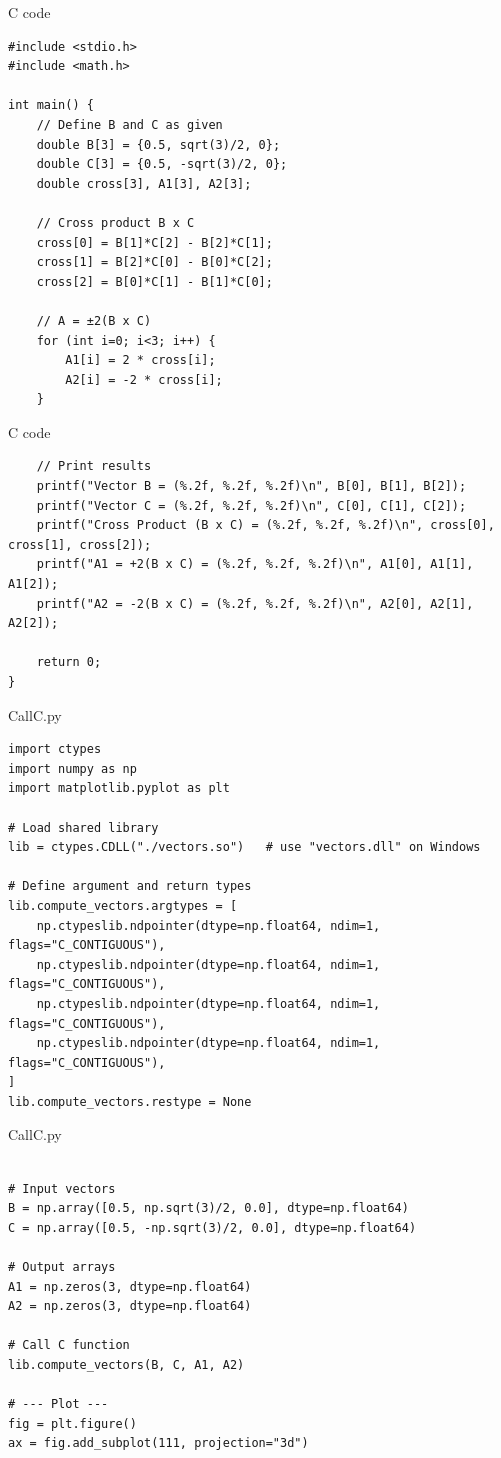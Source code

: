 \documentclass{beamer}
\begin{document}
\begin{frame}[fragile]{C code}
\begin{lstlisting}
#include <stdio.h>
#include <math.h>

int main() {
    // Define B and C as given
    double B[3] = {0.5, sqrt(3)/2, 0};
    double C[3] = {0.5, -sqrt(3)/2, 0};
    double cross[3], A1[3], A2[3];

    // Cross product B x C
    cross[0] = B[1]*C[2] - B[2]*C[1];
    cross[1] = B[2]*C[0] - B[0]*C[2];
    cross[2] = B[0]*C[1] - B[1]*C[0];

    // A = ±2(B x C)
    for (int i=0; i<3; i++) {
        A1[i] = 2 * cross[i];
        A2[i] = -2 * cross[i];
    }
\end{lstlisting}
\end{frame}

\begin{frame}[fragile]{C code}
\begin{lstlisting}
    // Print results
    printf("Vector B = (%.2f, %.2f, %.2f)\n", B[0], B[1], B[2]);
    printf("Vector C = (%.2f, %.2f, %.2f)\n", C[0], C[1], C[2]);
    printf("Cross Product (B x C) = (%.2f, %.2f, %.2f)\n", cross[0], cross[1], cross[2]);
    printf("A1 = +2(B x C) = (%.2f, %.2f, %.2f)\n", A1[0], A1[1], A1[2]);
    printf("A2 = -2(B x C) = (%.2f, %.2f, %.2f)\n", A2[0], A2[1], A2[2]);

    return 0;
}
\end{lstlisting}
\end{frame}

\begin{frame}[fragile]{CallC.py}
\begin{lstlisting}
import ctypes
import numpy as np
import matplotlib.pyplot as plt

# Load shared library
lib = ctypes.CDLL("./vectors.so")   # use "vectors.dll" on Windows

# Define argument and return types
lib.compute_vectors.argtypes = [
    np.ctypeslib.ndpointer(dtype=np.float64, ndim=1, flags="C_CONTIGUOUS"),
    np.ctypeslib.ndpointer(dtype=np.float64, ndim=1, flags="C_CONTIGUOUS"),
    np.ctypeslib.ndpointer(dtype=np.float64, ndim=1, flags="C_CONTIGUOUS"),
    np.ctypeslib.ndpointer(dtype=np.float64, ndim=1, flags="C_CONTIGUOUS"),
]
lib.compute_vectors.restype = None

\end{lstlisting}
\end{frame}

\begin{frame}[fragile]{CallC.py}
\begin{lstlisting}

# Input vectors
B = np.array([0.5, np.sqrt(3)/2, 0.0], dtype=np.float64)
C = np.array([0.5, -np.sqrt(3)/2, 0.0], dtype=np.float64)

# Output arrays
A1 = np.zeros(3, dtype=np.float64)
A2 = np.zeros(3, dtype=np.float64)

# Call C function
lib.compute_vectors(B, C, A1, A2)

# --- Plot ---
fig = plt.figure()
ax = fig.add_subplot(111, projection="3d")
\end{lstlisting}
\end{frame}
\end{document}

